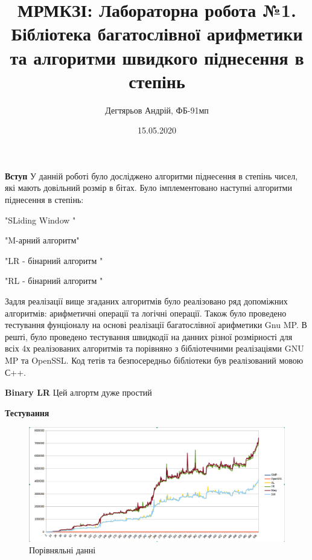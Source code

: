 \documentclass{article}
\author{Дегтярьов Андрій, ФБ-91мп}
\begin{document}

\title{\textbf{МРМКЗІ: Лабораторна робота №1. Бібліотека багатослівної арифметики та алгоритми
швидкого піднесення в степінь }}

\date{15.05.2020}
\maketitle
\hspace{10pt}

\normalsize
\textbf{Вступ}  
У данній роботі було досліджено алгоритми піднесення в степінь чисел, які мають довільний розмір в бітах. 
Було імплементовано наступні алгоритми піднесення в степінь: 
\begin{list}
\item "SLiding Window "
\item "M-арний алгоритм"
\item "LR - бінарний алгоритм "
\item "RL - бінарний алгоритм "
\end{list}

Задля реалізації вище згаданих алгоритмів було реалізовано ряд допоміжних алгоритмів: арифметичні операції та
логічні операції.
Також було проведено тестування фунціоналу на основі реалізації багатослівної арифметики Gnu MP.
В решті, було проведено тестування швидкодії на данних різної розмірності для всіх 4х реалізованих 
алгоритмів та порівняно з бібліотечними реалізаціями GNU MP та OpenSSL.
Код тетів та безпосередньо бібліотеки був реалізований мовою С++.

\textbf{Binary LR}
Цей алгортм дуже простий 


\textbf{Тестування}
\begin{figure}[h!]
  \includegraphics[width=\linewidth]{"gr.png"}
  \caption{Порівняльні данні}
  \label{fig:cmp}
\end{figure}
\end{document}
